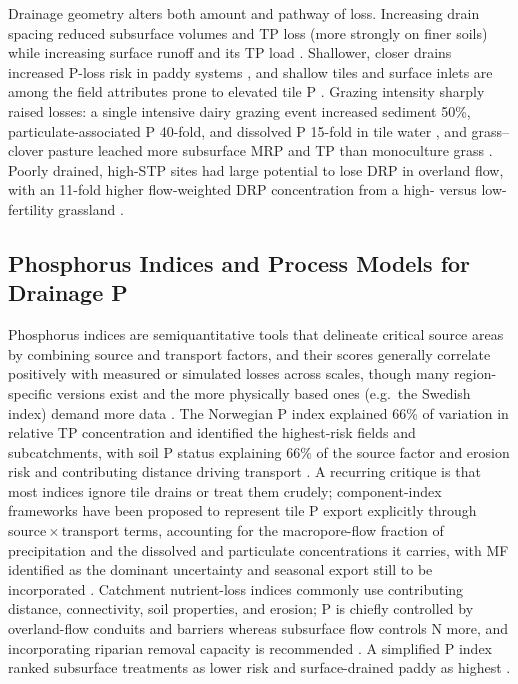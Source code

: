 Drainage geometry alters both amount and pathway of loss. Increasing drain spacing reduced
subsurface volumes and TP loss (more strongly on finer soils) while increasing surface runoff and
its TP load \parencite{Morrison2013}. Shallower, closer drains increased P-loss risk in paddy
systems \parencite{DarziNaftchali2016}, and shallow tiles and surface inlets are among the field
attributes prone to elevated tile P \parencite{King2015}. Grazing intensity sharply raised losses:
a single intensive dairy grazing event increased sediment 50\%, particulate-associated P 40-fold,
and dissolved P 15-fold in tile water \parencite{Gillingham2000}, and grass--clover pasture leached
more subsurface MRP and TP than monoculture grass \parencite{Hooda1999}. Poorly drained,
high-STP sites had large potential to lose DRP in overland flow, with an 11-fold higher
flow-weighted DRP concentration from a high- versus low-fertility grassland
\parencite{Kurz2005}.

\subsection{Phosphorus Indices and Process Models for Drainage P}

Phosphorus indices are semiquantitative tools that delineate critical source areas by combining
source and transport factors, and their scores generally correlate positively with measured or
simulated losses across scales, though many region-specific versions exist and the more
physically based ones (e.g.\ the Swedish index) demand more data
\parencite{Buczko2007}. The Norwegian P index explained 66\% of variation in relative TP
concentration and identified the highest-risk fields and subcatchments, with soil P status
explaining 66\% of the source factor and erosion risk and contributing distance driving transport
\parencite{Bechmann2007}. A recurring critique is that most indices ignore tile drains or treat
them crudely; component-index frameworks have been proposed to represent tile P export explicitly
through source\,$\times$\,transport terms, accounting for the macropore-flow fraction of
precipitation and the dissolved and particulate concentrations it carries, with MF identified as
the dominant uncertainty and seasonal export still to be incorporated
\parencite{Reid2012}. Catchment nutrient-loss indices commonly use contributing distance,
connectivity, soil properties, and erosion; P is chiefly controlled by overland-flow conduits and
barriers whereas subsurface flow controls N more, and incorporating riparian removal capacity is
recommended \parencite{Pärn2012}. A simplified P index ranked subsurface treatments as lower risk
and surface-drained paddy as highest \parencite{DarziNaftchali2016}.

